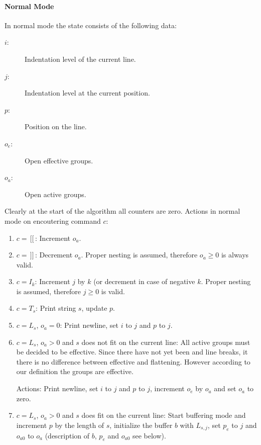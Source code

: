 \documentclass[12pt]{article}
\def\GS{\,[\![\,}
\def\GE{\,]\!]\,}
\begin{document}
\paragraph{Normal Mode} In normal mode the state consists of the following
data:
\begin{description}
\item[$i$:] Indentation level of the current line.
\item[$j$:] Indentation level at the current position.
\item[$p$:] Position on the line.
\item[$o_e$:] Open effective groups.
\item[$o_a$:] Open active groups.
\end{description}
%
Clearly at the start of the algorithm all counters are zero. Actions in normal
mode on encoutering command $c$:
\begin{enumerate}

\item $c = \GS$: Increment $o_a$.

\item $c = \GE$: Decrement $o_a$. Proper nesting is assumed, therefore $o_a
  \ge 0$ is always valid.

\item $c = I_k$: Increment $j$ by $k$ (or decrement in case of negative
  $k$. Proper nesting is assumed, therefore $j \ge 0$ is valid.

\item $c = T_s$: Print string $s$, update $p$.

\item $c = L_s$, $o_a = 0$: Print newline, set $i$ to $j$ and $p$ to $j$.

\item $c = L_s$, $o_a > 0$ and $s$ does not fit on the current line: All
  active groups must be decided to be effective. Since there have not yet been
  and line breaks, it there is no difference between effective and
  flattening. However according to our definition the groups are
  effective.

  Actions: Print newline, set $i$ to $j$ and $p$ to $j$, increment $o_e$ by
  $o_a$ and set $o_a$ to zero.

\item $c = L_s$, $o_a > 0$ and $s$ does fit on the current line: Start
  buffering mode and increment $p$ by the length of $s$, initialize the buffer
  $b$ with $L_{s,j}$, set $p_e$ to $j$ and $o_{a0}$ to $o_a$ (description of
  $b$, $p_e$ and $o_{a0}$ see below).
\end{enumerate}
\end{document}

